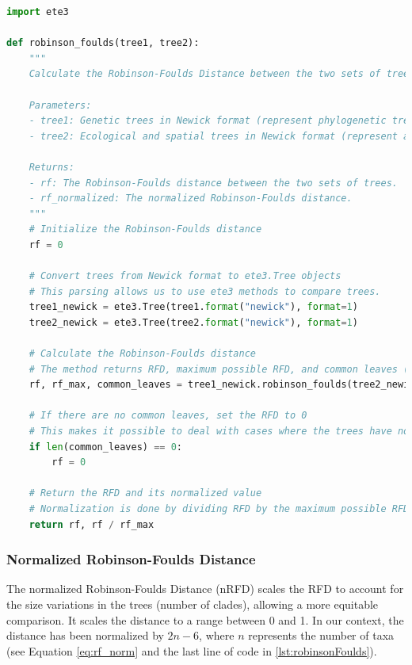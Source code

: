 \begin{lstlisting}[label=lst:robinsonFoulds,language=Python,caption=Python script for calculating the Robinson-Foulds Distance using the ete3 package in the aPhyloGeo package.]
import ete3

def robinson_foulds(tree1, tree2):
    """
    Calculate the Robinson-Foulds Distance between the two sets of trees.

    Parameters:
    - tree1: Genetic trees in Newick format (represent phylogenetic trees in text form).
    - tree2: Ecological and spatial trees in Newick format (represent attributes trees in text form).

    Returns:
    - rf: The Robinson-Foulds distance between the two sets of trees.
    - rf_normalized: The normalized Robinson-Foulds distance.
    """
    # Initialize the Robinson-Foulds distance
    rf = 0

    # Convert trees from Newick format to ete3.Tree objects
    # This parsing allows us to use ete3 methods to compare trees.
    tree1_newick = ete3.Tree(tree1.format("newick"), format=1)
    tree2_newick = ete3.Tree(tree2.format("newick"), format=1)

    # Calculate the Robinson-Foulds distance
    # The method returns RFD, maximum possible RFD, and common leaves (i.e., taxa) between the trees.
    rf, rf_max, common_leaves = tree1_newick.robinson_foulds(tree2_newick, unrooted_trees=True)

    # If there are no common leaves, set the RFD to 0
    # This makes it possible to deal with cases where the trees have no overlapping taxa.
    if len(common_leaves) == 0:
        rf = 0

    # Return the RFD and its normalized value
    # Normalization is done by dividing RFD by the maximum possible RFD.
    return rf, rf / rf_max
\end{lstlisting}

\subsubsection{Normalized Robinson-Foulds Distance}\label{RFnorm}
The normalized Robinson-Foulds Distance (nRFD) scales the RFD to account for the size variations in the trees (number of clades), allowing a more equitable comparison. It scales the distance to a range between 0 and 1. In our context, the distance has been normalized by $2n-6$, where $n$ represents the number of taxa (see Equation \eqref{eq:rf_norm} and the last line of code in \autoref{lst:robinsonFoulds}). 

